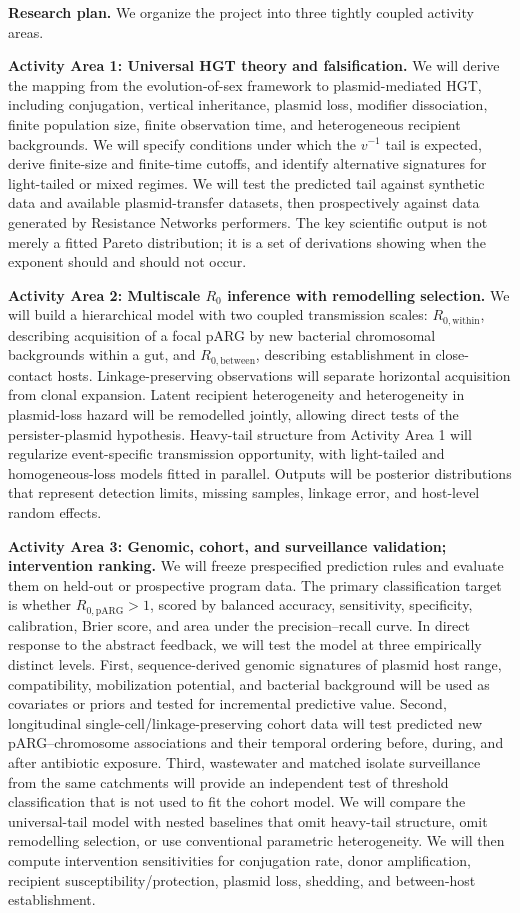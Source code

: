 \documentclass[12pt,a4paper]{article}
\newcommand{\Rwithin}{R_{0,\mathrm{within}}}
\newcommand{\Rbetween}{R_{0,\mathrm{between}}}
\newcommand{\RpARG}{R_{0,\mathrm{pARG}}}
\begin{document}
\textbf{Research plan.} We organize the project into three tightly coupled activity areas.

\textbf{Activity Area 1: Universal HGT theory and falsification.} We will derive the mapping from the evolution-of-sex framework to plasmid-mediated HGT, including conjugation, vertical inheritance, plasmid loss, modifier dissociation, finite population size, finite observation time, and heterogeneous recipient backgrounds. We will specify conditions under which the $v^{-1}$ tail is expected, derive finite-size and finite-time cutoffs, and identify alternative signatures for light-tailed or mixed regimes. We will test the predicted tail against synthetic data and available plasmid-transfer datasets, then prospectively against data generated by Resistance Networks performers. The key scientific output is not merely a fitted Pareto distribution; it is a set of derivations showing when the exponent should and should not occur.

\textbf{Activity Area 2: Multiscale $R_0$ inference with remodelling selection.} We will build a hierarchical model with two coupled transmission scales: $\Rwithin$, describing acquisition of a focal pARG by new bacterial chromosomal backgrounds within a gut, and $\Rbetween$, describing establishment in close-contact hosts. Linkage-preserving observations will separate horizontal acquisition from clonal expansion. Latent recipient heterogeneity and heterogeneity in plasmid-loss hazard will be remodelled jointly, allowing direct tests of the persister-plasmid hypothesis. Heavy-tail structure from Activity Area 1 will regularize event-specific transmission opportunity, with light-tailed and homogeneous-loss models fitted in parallel. Outputs will be posterior distributions that represent detection limits, missing samples, linkage error, and host-level random effects.

\textbf{Activity Area 3: Genomic, cohort, and surveillance validation; intervention ranking.} We will freeze prespecified prediction rules and evaluate them on held-out or prospective program data. The primary classification target is whether $\RpARG>1$, scored by balanced accuracy, sensitivity, specificity, calibration, Brier score, and area under the precision--recall curve. In direct response to the abstract feedback, we will test the model at three empirically distinct levels. First, sequence-derived genomic signatures of plasmid host range, compatibility, mobilization potential, and bacterial background will be used as covariates or priors and tested for incremental predictive value. Second, longitudinal single-cell/linkage-preserving cohort data will test predicted new pARG--chromosome associations and their temporal ordering before, during, and after antibiotic exposure. Third, wastewater and matched isolate surveillance from the same catchments will provide an independent test of threshold classification that is not used to fit the cohort model. We will compare the universal-tail model with nested baselines that omit heavy-tail structure, omit remodelling selection, or use conventional parametric heterogeneity. We will then compute intervention sensitivities for conjugation rate, donor amplification, recipient susceptibility/protection, plasmid loss, shedding, and between-host establishment.
\end{document}
